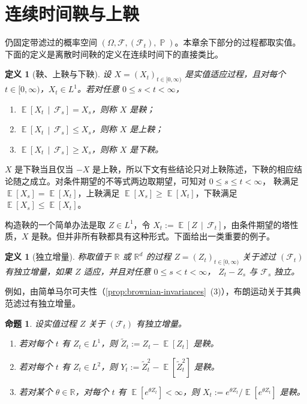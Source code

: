 \documentclass[UTF8,11pt,a4paper,oneside,fontset=fandol]{ctexrep}
\numberwithin{equation}{section}
\theoremstyle{zhthm}
\newtheorem{proposition}[theorem]{命题}
\newtheorem{definition}[theorem]{定义}
\newcommand{\R}{\mathbb{R}}
\newcommand{\F}{\mathcal{F}}
\DeclareMathOperator{\Prob}{\mathbb{P}}
\DeclareMathOperator{\E}{\mathbb{E}}
\newcommand{\Econd}[2]{%
  \E\!\left[#1\,\middle|\,#2\right]}
\begin{document}
\section{连续时间鞅与上鞅}
\label{sec:continuous-martingales}

仍固定带滤过的概率空间 $(\Omega,\F,(\F_t),\Prob)$。本章余下部分的过程都取实值。下面的定义是离散时间鞅的定义\cite[\S4.2]{Durrett2019}在连续时间下的直接类比。

\begin{definition}[鞅、上鞅与下鞅]
\label{def:martingale}
设 $X=(X_t)_{t\in[0,\infty)}$ 是实值适应过程，且对每个 $t\in[0,\infty)$，$X_t\in L^1$。若对任意 $0\le s<t<\infty$，
\begin{enumerate}[label=(\arabic*)]
  \item $\Econd{X_t}{\F_s}=X_s$，则称 $X$ 是鞅；
  \item $\Econd{X_t}{\F_s}\le X_s$，则称 $X$ 是上鞅；
  \item $\Econd{X_t}{\F_s}\ge X_s$，则称 $X$ 是下鞅。
\end{enumerate}
\end{definition}

$X$ 是下鞅当且仅当 $-X$ 是上鞅，所以下文有些结论只对上鞅陈述，下鞅的相应结论随之成立。对条件期望的不等式两边取期望，可知对 $0\le s\le t<\infty$，
鞅满足 $\E[X_s]=\E[X_t]$，上鞅满足 $\E[X_s]\ge\E[X_t]$，下鞅满足 $\E[X_s]\le\E[X_t]$。

构造鞅的一个简单办法是取 $Z\in L^1$，令 $X_t:=\Econd{Z}{\F_t}$，由条件期望的塔性质\cite[定理 4.1.13]{Durrett2019}，$X$ 是鞅。但并非所有鞅都具有这种形式。下面给出一类重要的例子。

\begin{definition}[独立增量]
\label{def:independent-increments}
称取值于 $\R$ 或 $\R^d$ 的过程 $Z=(Z_t)_{t\in[0,\infty)}$ 关于滤过 $(\F_t)$ 有独立增量，如果 $Z$ 适应，并且对任意 $0\le s<t<\infty$，
$Z_t-Z_s$ 与 $\F_s$ 独立。
\end{definition}

例如，由简单马尔可夫性（\cref{prop:brownian-invariances}~(3)），布朗运动关于其典范滤过有独立增量。

\begin{proposition}
\label{prop:independent-increments-martingales}
设实值过程 $Z$ 关于 $(\F_t)$ 有独立增量。
\begin{enumerate}[label=(\arabic*)]
  \item 若对每个 $t$ 有 $Z_t\in L^1$，则 $\widetilde Z_t:=Z_t-\E[Z_t]$ 是鞅。
  \item 若对每个 $t$ 有 $Z_t\in L^2$，则 $Y_t:=\widetilde Z_t^2-\E[\widetilde Z_t^2]$ 是鞅。
  \item 若对某个 $\theta\in\R$，对每个 $t$ 有 $\E[e^{\theta Z_t}]<\infty$，则 $X_t:=e^{\theta Z_t}/\E[e^{\theta Z_t}]$ 是鞅。
\end{enumerate}
\end{proposition}
\end{document}
